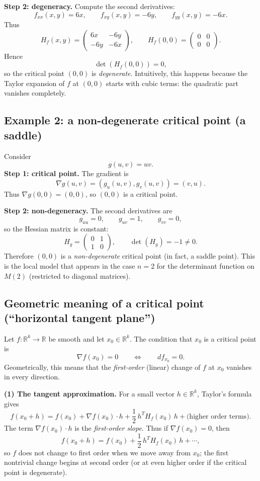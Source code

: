 \documentclass[12pt,a4paper]{article}
\theoremstyle{plain}
\theoremstyle{definition}      %
\begin{document}
	\smallskip
	\noindent\textbf{Step 2: degeneracy.}
	Compute the second derivatives:
	\[
	f_{xx}(x,y)=6x,\qquad f_{xy}(x,y)=-6y,\qquad f_{yy}(x,y)=-6x.
	\]
	Thus
	\[
	H_f(x,y)=
	\begin{pmatrix}
		6x & -6y\\
		-6y & -6x
	\end{pmatrix},
	\qquad
	H_f(0,0)=
	\begin{pmatrix}
		0 & 0\\
		0 & 0
	\end{pmatrix}.
	\]
	Hence
	\[
	\det(H_f(0,0))=0,
	\]
	so the critical point $(0,0)$ is \emph{degenerate}. Intuitively, this happens because the Taylor expansion of $f$ at
	$(0,0)$ starts with cubic terms: the quadratic part vanishes completely.
	
	\medskip
	\subsection*{Example 2: a non-degenerate critical point (a saddle)}
	Consider
	\[
	g(u,v)=uv.
	\]
	\noindent\textbf{Step 1: critical point.}
	The gradient is
	\[
	\nabla g(u,v)=(g_u(u,v),g_v(u,v))=(v,u).
	\]
	Thus $\nabla g(0,0)=(0,0)$, so $(0,0)$ is a critical point.
	
	\smallskip
	\noindent\textbf{Step 2: non-degeneracy.}
	The second derivatives are
	\[
	g_{uu}=0,\qquad g_{uv}=1,\qquad g_{vv}=0,
	\]
	so the Hessian matrix is constant:
	\[
	H_g=
	\begin{pmatrix}
		0 & 1\\
		1 & 0
	\end{pmatrix},
	\qquad
	\det(H_g)=-1\neq 0.
	\]
	Therefore $(0,0)$ is a \emph{non-degenerate} critical point (in fact, a saddle point). This is the local model
	that appears in the case $n=2$ for the determinant function on $M(2)$ (restricted to diagonal matrices).
	
	\subsection*{Geometric meaning of a critical point (``horizontal tangent plane'')}
	
	\noindent
	Let $f:\mathbb{R}^k\to\mathbb{R}$ be smooth and let $x_0\in\mathbb{R}^k$.
	The condition that $x_0$ is a critical point is
	\[
	\nabla f(x_0)=0
	\qquad\Longleftrightarrow\qquad
	df_{x_0}=0.
	\]
	Geometrically, this means that the \emph{first-order} (linear) change of $f$ at $x_0$ vanishes in every direction.
	
	\medskip
	\noindent\textbf{(1) The tangent approximation.}
	For a small vector $h\in\mathbb{R}^k$, Taylor's formula gives
	\[
	f(x_0+h)=f(x_0)+\nabla f(x_0)\cdot h+\frac12\,h^T H_f(x_0)\,h+\text{(higher order terms)}.
	\]
	The term $\nabla f(x_0)\cdot h$ is the \emph{first-order slope}.
	Thus if $\nabla f(x_0)=0$, then
	\[
	f(x_0+h)=f(x_0)+\frac12\,h^T H_f(x_0)\,h+\cdots,
	\]
	so $f$ does not change to first order when we move away from $x_0$; the first nontrivial change begins at second order
	(or at even higher order if the critical point is degenerate).
	
\end{document}
